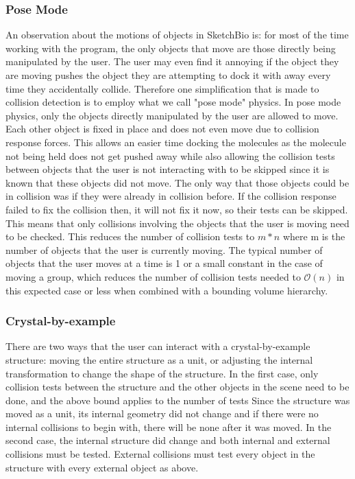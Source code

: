 \documentclass{article} %
\begin{document}
\subsubsection{Pose Mode}
An observation about the motions of objects in SketchBio is: for most of the time working with the program, the only objects that move are those directly being manipulated by the user.  The user may even find it annoying if the object they are moving pushes the object they are attempting to dock it with away every time they accidentally collide.  Therefore one simplification that is made to collision detection is to employ what we call "pose mode" physics.  In pose mode physics, only the objects directly manipulated by the user are allowed to move.  Each other object is fixed in place and does not even move due to collision response forces.  This allows an easier time docking the molecules as the molecule not being held does not get pushed away while also allowing the collision tests between objects that the user is not interacting with to be skipped since it is known that these objects did not move.  The only way that those objects could be in collision was if they were already in collision before.  If the collision response failed to fix the collision then, it will not fix it now, so their tests can be skipped.  This means that only collisions involving the objects that the user is moving need to be checked.  This reduces the number of collision tests to $m*n$ where m is the number of objects that the user is currently moving.  The typical number of objects that the user moves at a time is 1 or a small constant in the case of moving a group, which reduces the number of collision tests needed to $\mathcal{O}(n)$ in this expected case or less when combined with a bounding volume hierarchy.

\subsubsection{Crystal-by-example}
There are two ways that the user can interact with a crystal-by-example structure: moving the entire structure as a unit, or adjusting the internal transformation to change the shape of the structure.  In the first case, only collision tests between the structure and the other objects in the scene need to be done, and the above bound applies to the number of tests  Since the structure was moved as a unit, its internal geometry did not change and if there were no internal collisions to begin with, there will be none after it was moved.  In the second case, the internal structure did change and both internal and external collisions must be tested.  External collisions must test every object in the structure with every external object as above.
\end{document}
